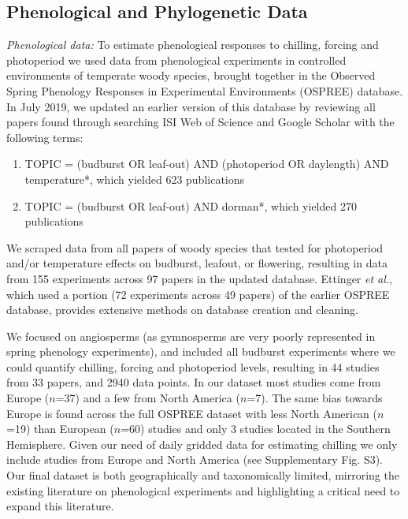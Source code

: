\documentclass[11pt]{article}
\begin{document}
\subsection*{Phenological and Phylogenetic Data}
\emph{Phenological data:} To estimate phenological responses to chilling, forcing and photoperiod we used data from phenological experiments in controlled environments of temperate woody species, brought together in the Observed Spring Phenology Responses in Experimental Environments (OSPREE) database. In July 2019, we updated an earlier version of this database \citep{wolkovich2019} by reviewing all papers found through searching ISI Web of Science and Google Scholar with the following terms: 
\begin{enumerate}
\item TOPIC = (budburst OR leaf-out) AND (photoperiod OR daylength) AND temperature*, which yielded 623 publications
\item TOPIC = (budburst OR leaf-out) AND dorman*, which yielded 270 publications
\end{enumerate}
We scraped data from all papers of woody species that tested for photoperiod and/or temperature effects on budburst, leafout, or flowering, resulting in data from 155 experiments across 97 papers in the updated database. Ettinger \emph{et al.}\citep{ettinger2020}, which used a portion (72 experiments across 49 papers) of the earlier OSPREE database, provides extensive methods on  database creation and cleaning.

We focused on angiosperms (as gymnosperms are very poorly represented in spring phenology experiments), and included all budburst experiments where we could quantify chilling, forcing and photoperiod levels, resulting in 44 studies from 33 papers, and 2940 data points. 
In our dataset most studies come from Europe ($n$=37) and a few from North America ($n$=7). The same bias towards Europe is found across the full OSPREE dataset with less North American ($n$=19) than European ($n$=60) studies and only 3 studies located in the Southern Hemisphere. Given our need of daily gridded data for estimating chilling we only include studies from Europe and North America (see Supplementary Fig. S3). Our final dataset is both geographically and taxonomically limited, mirroring the existing literature on phenological experiments and highlighting a critical need to expand this literature. 
\end{document}

